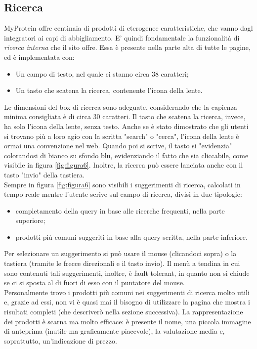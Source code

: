 \subsection{Ricerca}
MyProtein offre centinaia di prodotti di eterogenee caratteristiche, che vanno dagl integratori ai capi di abbigliamento. E' quindi fondamentale la funzionalità di \textit{ricerca interna} che il sito offre. Essa è presente nella parte alta di tutte le pagine, ed è implementata con:
\begin{itemize}
    \item Un campo di testo, nel quale ci stanno circa 38 caratteri;
    \item Un tasto che scatena la ricerca, contenente l'icona della lente.
\end{itemize}
Le dimensioni del box di ricerca sono adeguate, considerando che la capienza minima consigliata è di circa 30 caratteri. Il tasto che scatena la ricerca, invece, ha solo l'icona della lente, senza testo. Anche se è stato dimostrato che gli utenti si trovano più a loro agio con la scritta "search" o "cerca", l'icona della lente è ormai una convenzione nel web. Quando poi si scrive, il tasto si "evidenzia" colorandosi di bianco su sfondo blu, evidenziando il fatto che sia cliccabile, come visibile in figura \ref{fig:figura6}. Inoltre, la ricerca può essere lanciata anche con il tasto "invio" della tastiera.\\
Sempre in figura \ref{fig:figura6} sono visibili i suggerimenti di ricerca, calcolati in tempo reale mentre l'utente scrive sul campo di ricerca, divisi in due tipologie:
\begin{itemize}
    \item completamento della query in base alle ricerche frequenti, nella parte superiore;
    \item prodotti più comuni suggeriti in base alla query scritta, nella parte inferiore.
\end{itemize}
Per selezionare un suggerimento si può usare il mouse (clicandoci sopra) o la tastiera (tramite le frecce direzionali e il tasto invio). Il menù a tendina in cui sono contenuti tali suggerimenti, inoltre, è fault tolerant, in quanto non si chiude se ci si sposta al di fuori di esso con il puntatore del mouse. \\
Personalmente trovo i prodotti più comuni nei suggerimenti di ricerca molto utili e, grazie ad essi, non vi è quasi mai il bisogno di utilizzare la pagina che mostra i risultati completi (che descriverò nella sezione successiva). La rappresentazione dei prodotti è scarna ma molto efficace: è presente il nome, una piccola immagine di anteprima (inutile ma graficamente piacevole), la valutazione media e, soprattutto, un'indicazione di prezzo.
